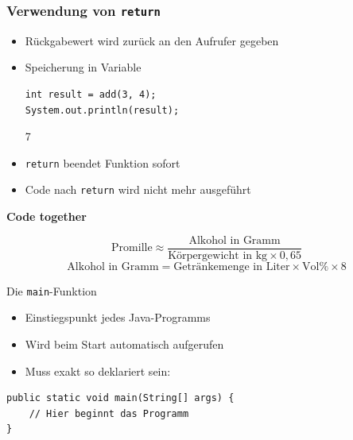 \documentclass{../../presentation}
\begin{document}
\begin{frame}[fragile]
	\frametitle{Verwendung von \texttt{return}}

	\begin{itemize}
		\item\pause Rückgabewert wird zurück an den Aufrufer gegeben
		\item\pause Speicherung in Variable
		      \begin{verbatim}
int result = add(3, 4);
System.out.println(result); 
		\end{verbatim}
		      \begin{ausgabe}
			      7
		      \end{ausgabe}
		\item\pause \texttt{return} beendet Funktion sofort
		\item\pause Code nach \texttt{return} wird nicht mehr ausgeführt
	\end{itemize}
\end{frame}


\begin{frame}[plain]
	\centering
	{\Huge\bfseries{Code together}}
	\begin{block}{}
		\[
			\text{Promille} \approx \frac{\text{Alkohol in Gramm}}{\text{Körpergewicht in kg} \times 0{,}65}
		\]
		\[
			\text{Alkohol in Gramm} = \text{Getränkemenge in Liter} \times \text{Vol\%} \times 8
		\]
	\end{block}
\end{frame}


\begin{frame}[fragile]{Die \texttt{main}-Funktion}
	\begin{itemize}
		\item\pause Einstiegspunkt jedes Java-Programms
		\item\pause Wird beim Start automatisch aufgerufen
		\item\pause Muss exakt so deklariert sein:
	\end{itemize}

	\vspace{0.5em}

	\begin{verbatim}
public static void main(String[] args) {
    // Hier beginnt das Programm
}
\end{verbatim}
\end{frame}
\end{document}
